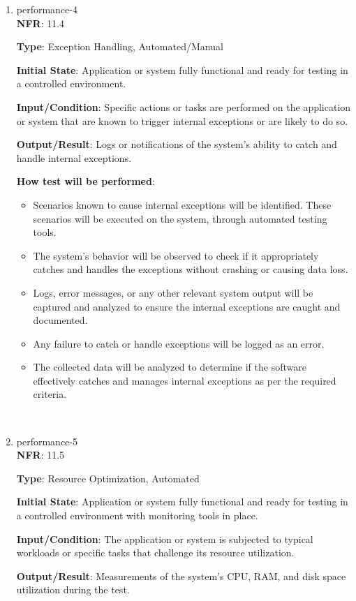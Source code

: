 \documentclass[12pt, titlepage]{article}
\begin{document}
\begin{enumerate}
\item{performance-4 \\}
\textbf{NFR}: 11.4

\textbf{Type}: Exception Handling, Automated/Manual

\textbf{Initial State}: Application or system fully functional and ready for testing in a controlled environment.

\textbf{Input/Condition}: Specific actions or tasks are performed on the application or system that are known to trigger internal exceptions or are likely to do so.

\textbf{Output/Result}: Logs or notifications of the system's ability to catch and handle internal exceptions.

\textbf{How test will be performed}: 
\begin{itemize}[noitemsep]
    \item Scenarios known to cause internal exceptions will be identified. These scenarios will be executed on the system, through automated testing tools.
    \item The system's behavior will be observed to check if it appropriately catches and handles the exceptions without crashing or causing data loss.
    \item Logs, error messages, or any other relevant system output will be captured and analyzed to ensure the internal exceptions are caught and documented.
    \item Any failure to catch or handle exceptions will be logged as an error.
    \item The collected data will be analyzed to determine if the software effectively catches and manages internal exceptions as per the required criteria.
\end{itemize}\\

\item{performance-5 \\}
\textbf{NFR}: 11.5

\textbf{Type}: Resource Optimization, Automated

\textbf{Initial State}: Application or system fully functional and ready for testing in a controlled environment with monitoring tools in place.

\textbf{Input/Condition}: The application or system is subjected to typical workloads or specific tasks that challenge its resource utilization.

\textbf{Output/Result}: Measurements of the system's CPU, RAM, and disk space utilization during the test.


\end{enumerate}
\end{document}
